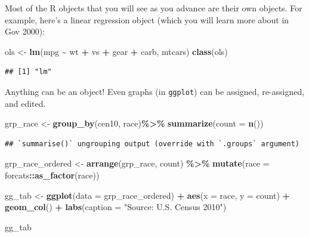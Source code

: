 \documentclass[
]{book}
\newenvironment{Shaded}{\begin{snugshade}}{\end{snugshade}}
\newcommand{\DataTypeTok}[1]{\textcolor[rgb]{0.13,0.29,0.53}{#1}}
\newcommand{\KeywordTok}[1]{\textcolor[rgb]{0.13,0.29,0.53}{\textbf{#1}}}
\newcommand{\NormalTok}[1]{#1}
\newcommand{\OperatorTok}[1]{\textcolor[rgb]{0.81,0.36,0.00}{\textbf{#1}}}
\newcommand{\StringTok}[1]{\textcolor[rgb]{0.31,0.60,0.02}{#1}}
\theoremstyle{definition}
\theoremstyle{definition}
\theoremstyle{definition}
\theoremstyle{remark}
\begin{document}
Most of the R objects that you will see as you advance are their own objects. For example, here's a linear regression object (which you will learn more about in Gov 2000):

\begin{Shaded}
\begin{Highlighting}[]
\NormalTok{ols <{-}}\StringTok{ }\KeywordTok{lm}\NormalTok{(mpg }\OperatorTok{\textasciitilde{}}\StringTok{ }\NormalTok{wt }\OperatorTok{+}\StringTok{ }\NormalTok{vs }\OperatorTok{+}\StringTok{ }\NormalTok{gear }\OperatorTok{+}\StringTok{ }\NormalTok{carb, mtcars)}
\KeywordTok{class}\NormalTok{(ols)}
\end{Highlighting}
\end{Shaded}

\begin{verbatim}
## [1] "lm"
\end{verbatim}

Anything can be an object! Even graphs (in \texttt{ggplot}) can be assigned, re-assigned, and edited.

\begin{Shaded}
\begin{Highlighting}[]
\NormalTok{grp\_race <{-}}\StringTok{ }\KeywordTok{group\_by}\NormalTok{(cen10, race)}\OperatorTok{\%>\%}
\StringTok{  }\KeywordTok{summarize}\NormalTok{(}\DataTypeTok{count =} \KeywordTok{n}\NormalTok{())}
\end{Highlighting}
\end{Shaded}

\begin{verbatim}
## `summarise()` ungrouping output (override with `.groups` argument)
\end{verbatim}

\begin{Shaded}
\begin{Highlighting}[]
\NormalTok{grp\_race\_ordered <{-}}\StringTok{ }\KeywordTok{arrange}\NormalTok{(grp\_race, count) }\OperatorTok{\%>\%}\StringTok{ }
\StringTok{  }\KeywordTok{mutate}\NormalTok{(}\DataTypeTok{race =}\NormalTok{ forcats}\OperatorTok{::}\KeywordTok{as\_factor}\NormalTok{(race))}

\NormalTok{gg\_tab <{-}}\StringTok{ }\KeywordTok{ggplot}\NormalTok{(}\DataTypeTok{data =}\NormalTok{ grp\_race\_ordered) }\OperatorTok{+}
\StringTok{  }\KeywordTok{aes}\NormalTok{(}\DataTypeTok{x =}\NormalTok{ race, }\DataTypeTok{y =}\NormalTok{ count) }\OperatorTok{+}
\StringTok{  }\KeywordTok{geom\_col}\NormalTok{() }\OperatorTok{+}
\StringTok{  }\KeywordTok{labs}\NormalTok{(}\DataTypeTok{caption =} \StringTok{"Source: U.S. Census 2010"}\NormalTok{)}

\NormalTok{gg\_tab}
\end{Highlighting}
\end{Shaded}
\end{document}
